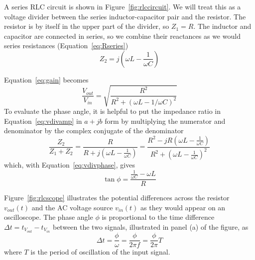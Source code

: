 \documentclass[11pt]{article}
\begin{document}
A series RLC circuit is shown in Figure~\ref{fig:rlccircuit}. We will
treat this as a voltage divider between the series inductor-capacitor
pair and the resistor. The resistor is by itself in the upper part of
the divider, so $Z_1 = R$. The inductor and capacitor are connected in
series, so we combine their reactances as we would series resistances
(Equation~\ref{eq:Rseries})
\begin{equation}
  Z_2 = j \left( \omega L - \frac{1}{\omega C} \right)
\end{equation}

Equation~\ref{eq:gain} becomes
\begin{equation}
  \frac{V_{out}}{V_{in}} = \sqrt{\frac{R^2}{R^2 + (\omega L - 1/\omega C)^2}}
\end{equation}
To evaluate the phase angle, it is helpful to put the
impedance ratio in Equation~\ref{eq:vdivamp} in $a + jb$ form by
multiplying the numerator and denominator by the complex conjugate of
the denominator
\begin{equation}
  \frac{Z_2}{Z_1 + Z_2}
  = \frac{R}{R + j \left( \omega L - \frac{1}{\omega C} \right)}
  = \frac{R^2 - j R \left( \omega L - \frac{1}{\omega C} \right)}
         {R^2 + \left( \omega L - \frac{1}{\omega C} \right)^2}
\end{equation}
which, with Equation~\ref{eq:vdivphase}, gives
\begin{equation}
  \tan \phi = \frac{\frac{1}{\omega C} - \omega L}{R}
\end{equation}

Figure~\ref{fig:rlcscope} illustrates the
potential differences across the resistor $v_{out}(t)$ and the AC
voltage source $v_{in}(t)$ as they would appear on an oscilloscope. 
The phase angle $\phi$ is proportional to the time difference $\Delta t =
t_{V_{out}} - t_{V_{in}}$ between the two signals, illustrated in
panel (a) of the figure, as 
\begin{equation}
  \Delta t = \frac{\phi}{\omega} = \frac{\phi}{2 \pi f} = \frac{\phi}{2 \pi} T
  \label{eq:deltatphi}
\end{equation}
where $T$ is the period of oscillation of the input signal.
\end{document}
